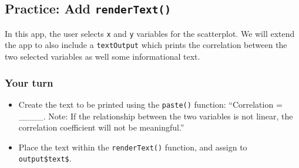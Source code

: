 \documentclass[
  letterpaper,
  DIV=11,
  numbers=noendperiod]{scrreprt}
\newenvironment{Shaded}{\begin{snugshade}}{\end{snugshade}}
\newcommand{\AttributeTok}[1]{\textcolor[rgb]{0.40,0.46,0.14}{#1}}
\newcommand{\CommentTok}[1]{\textcolor[rgb]{0.37,0.37,0.37}{#1}}
\newcommand{\ControlFlowTok}[1]{\textcolor[rgb]{0.00,0.46,0.62}{#1}}
\newcommand{\FunctionTok}[1]{\textcolor[rgb]{0.28,0.35,0.67}{#1}}
\newcommand{\NormalTok}[1]{\textcolor[rgb]{0.00,0.46,0.62}{#1}}
\newcommand{\OtherTok}[1]{\textcolor[rgb]{0.00,0.46,0.62}{#1}}
\newcommand{\SpecialCharTok}[1]{\textcolor[rgb]{0.37,0.37,0.37}{#1}}
\providecommand{\tightlist}{%
  \setlength{\itemsep}{0pt}\setlength{\parskip}{0pt}}
\begin{document}
\begin{Shaded}
\end{Shaded}

\hypertarget{practice-add-rendertext}{%
\subsection{\texorpdfstring{Practice: Add
\texttt{renderText()}}{Practice: Add renderText()}}\label{practice-add-rendertext}}

In this app, the user selects \texttt{x} and \texttt{y} variables for
the scatterplot. We will extend the app to also include a
\texttt{textOutput} which prints the correlation between the two
selected variables as well some informational text.

\hypertarget{your-turn-15}{%
\subsubsection{Your turn}\label{your-turn-15}}

\begin{itemize}
\tightlist
\item
  Create the text to be printed using the \texttt{paste()} function:
  ``Correlation = \_\_\_\_. Note: If the relationship between the two
  variables is not linear, the correlation coefficient will not be
  meaningful.''
\item
  Place the text within the \texttt{renderText()} function, and assign
  to \texttt{output\$text\$}.
\end{itemize}
\end{document}
